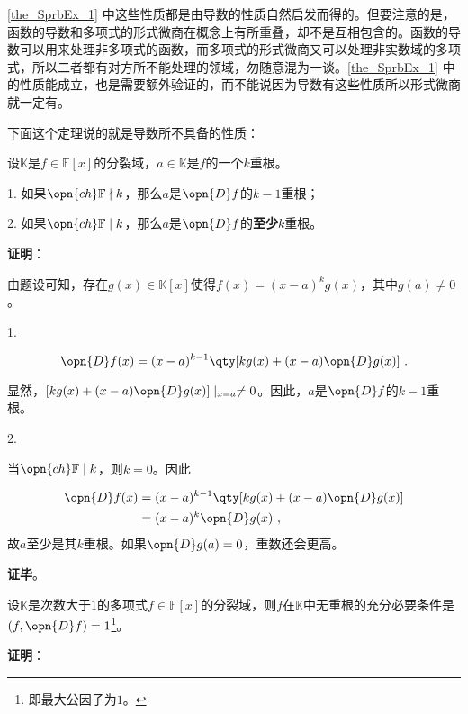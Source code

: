 \autoref{the_SprbEx_1} 中这些性质都是由导数的性质自然启发而得的。但要注意的是，函数的导数和多项式的形式微商在概念上有所重叠，却不是互相包含的。函数的导数可以用来处理非多项式的函数，而多项式的形式微商又可以处理非实数域的多项式，所以二者都有对方所不能处理的领域，勿随意混为一谈。\autoref{the_SprbEx_1} 中的性质能成立，也是需要额外验证的，而不能说因为导数有这些性质所以形式微商就一定有。

下面这个定理说的就是导数所不具备的性质：

\begin{theorem}{}\label{the_SprbEx_2}
设$\mathbb{K}$是$f\in\mathbb{F}[x]$的分裂域，$a\in\mathbb{K}$是$f$的一个$k$重根。

1. 如果$\opn{ch}\mathbb{F}\nmid k$，那么$a$是$\opn{D}f$的$k-1$重根；

2. 如果$\opn{ch}\mathbb{F}\mid k$，那么$a$是$\opn{D}f$的\textbf{至少}$k$重根。
\end{theorem}

\textbf{证明}：

由题设可知，存在$g(x)\in\mathbb{K}[x]$使得$f(x) = (x-a)^k g(x)$，其中$g(a)\neq 0$。

1. 

\begin{equation}
\opn{D}f(x)=(x-a)^{k-1}\qty[kg(x)+(x-a)\opn{D}g(x)]~.
\end{equation}

显然，$[kg(x)+(x-a)\opn{D}g(x)]\mid_{x=a}\neq 0$。因此，$a$是$\opn{D}f$的$k-1$重根。


2. 

当$\opn{ch}\mathbb{F}\mid k$，则$k=0$。因此

\begin{equation}
\begin{aligned}
\opn{D}f(x)&=(x-a)^{k-1}\qty[kg(x)+(x-a)\opn{D}g(x)]\\
&=(x-a)^k\opn{D}g(x)~,
\end{aligned}
\end{equation}
故$a$至少是其$k$重根。如果$\opn{D}g(a)=0$，重数还会更高。

\textbf{证毕}。



\begin{corollary}{}\label{cor_SprbEx_1}
设$\mathbb{K}$是次数大于$1$的多项式$f\in\mathbb{F}[x]$的分裂域，则$f$在$\mathbb{K}$中无重根的充分必要条件是$(f, \opn{D}f)=1$\footnote{即最大公因子为$1$。}。
\end{corollary}

\textbf{证明}：

